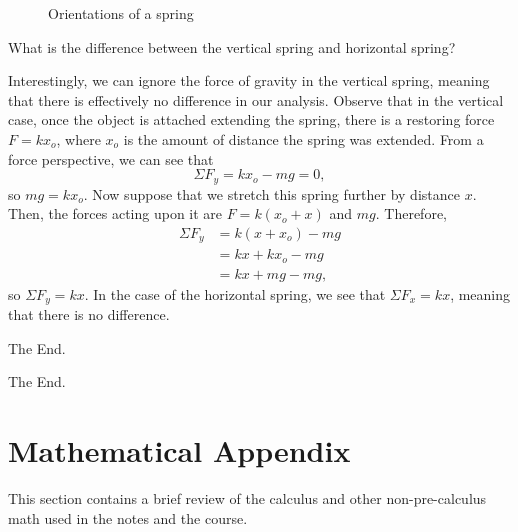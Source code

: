 \documentclass[11pt]{article}
\begin{document}
\begin{figure}[h!]
	\caption{Orientations of a spring}
\end{figure}

\medskip

\begin{question}
	What is the difference between the vertical spring and horizontal spring?
\end{question}
Interestingly, we can ignore the force of gravity in the vertical spring, meaning that there is effectively no difference in our analysis. Observe that in the vertical case, once the object is attached extending the spring, there is a restoring force $F = kx_o$, where $x_o$ is the amount of distance the spring was extended. From a force perspective, we can see that
\[\Sigma F_y = kx_o - mg = 0,\]
so $mg = kx_o$. Now suppose that we stretch this spring further by distance $x$. Then, the forces acting upon it are $F = k(x_o+x)$ and $mg$. Therefore,
\begin{align*}
	\Sigma F_y &= k(x+x_o) -mg \\
	&= kx + kx_o - mg \\
	&= kx + mg - mg,
\end{align*}
so $\Sigma F_y = kx$. In the case of the horizontal spring, we see that $\Sigma F_x = kx$, meaning that there is no difference.


\bigskip\bigskip

\begin{center}
    The End.
\end{center}


\newpage

\bigskip\bigskip

\begin{center}
    The End.
\end{center}


\newpage

\part{Mathematical Appendix}
This section contains a brief review of the calculus and other non-pre-calculus math used in the notes and the course.
\end{document}
